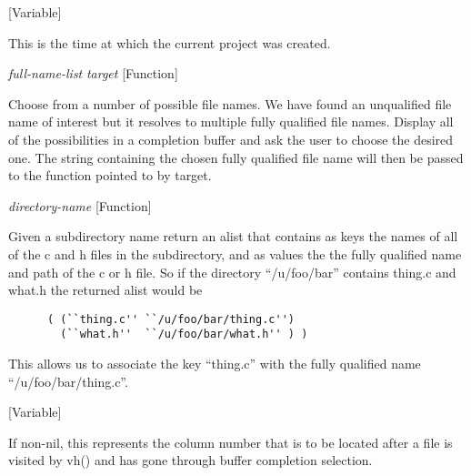 \vspace{1em}
\noindent
{}
\usebox{\funcname}
 \hfill [Variable]

\begin{doc-string}
This is the time at which the current project was created.
\end{doc-string}

\vspace{1em}
\noindent
{}
\usebox{\funcname}\emph{full-name-list} \emph{target}
 \hfill [Function]

\begin{doc-string}
Choose from a number of possible file names.
We have found an unqualified file name of interest but it resolves to multiple
fully qualified file names.  Display all of the possibilities in a completion
buffer and ask the user to choose the desired one.  The string containing the
chosen fully qualified file name will then be passed to the function pointed
to by target.
\end{doc-string}

\vspace{1em}
\noindent
{}
\usebox{\funcname}\emph{directory-name}
 \hfill [Function]

\begin{doc-string}
Given a subdirectory name return an alist that contains as keys the names
of all of the c and h files in the subdirectory, and as values the the
fully qualified name and path of the c or h file.  So if the directory
``/u/foo/bar'' contains thing.c and what.h the returned alist would be

\begin{verbatim}
      ( (``thing.c'' ``/u/foo/bar/thing.c'')
        (``what.h''  ``/u/foo/bar/what.h'' ) )
\end{verbatim}

This allows us to associate the key ``thing.c'' with the fully qualified
name ``/u/foo/bar/thing.c''.
\end{doc-string}

\vspace{1em}
\noindent
{}
\usebox{\funcname}
 \hfill [Variable]

\begin{doc-string}
If non-nil, this represents the column number that is to be located after a
file is visited by vh() and has gone through buffer completion selection.
\end{doc-string}

